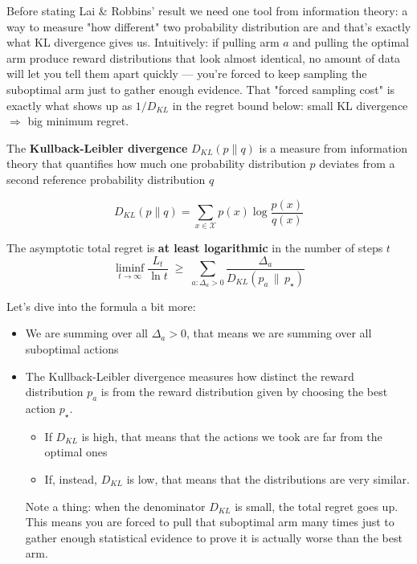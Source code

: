 Before stating Lai \& Robbins' result we need one tool from information theory: a way to measure "how different" two probability distribution are and that's exactly what KL divergence gives us. Intuitively: if pulling arm $a$ and pulling the optimal arm produce reward distributions that look almost identical, no amount of data will let you tell them apart quickly — you're forced to keep sampling the suboptimal arm just to gather enough evidence. That "forced sampling cost" is exactly what shows up as $1/D_{KL}$ in the regret bound below: small KL divergence $\Rightarrow$ big minimum regret.

\begin{definition}
    The \textbf{Kullback-Leibler divergence} $D_{KL}(p \parallel q)$ is a measure from information theory that quantifies how much one probability distribution $p$ deviates from a second reference probability distribution $q$

    \[
        D_{KL}(p \parallel q) = \sum_{x \in \mathcal{X}} p(x) \log \frac{p(x)}{q(x)}
    \]
\end{definition}

\begin{theorem}
    The asymptotic total regret is \textbf{at least logarithmic} in the number of steps $t$
    \[
        \liminf_{t\to\infty} \frac{L_t}{\ln t} \;\ge\; \sum_{a:\Delta_a>0} \frac{\Delta_a}{D_{KL}(p_a \,\|\, p_\star)}
    \]
\end{theorem}

\noindent
Let's dive into the formula a bit more:
\begin{itemize}
    \item We are summing over all $\Delta_a > 0$, that means we are summing over all suboptimal actions
    \item The Kullback-Leibler divergence measures how distinct the reward distribution $p_a$ is from the reward distribution given by choosing the best action $p_\star$.
    \begin{itemize}
        \item If $D_{KL}$ is high, that means that the actions we took are far from the optimal ones
        \item If, instead, $D_{KL}$ is low, that means that the distributions are very similar.
    \end{itemize}
    Note a thing: when the denominator $D_{KL}$ is small, the total regret goes up. This means you are forced to pull that suboptimal arm many times just to gather enough statistical evidence to prove it is actually worse than the best arm.
\end{itemize}

